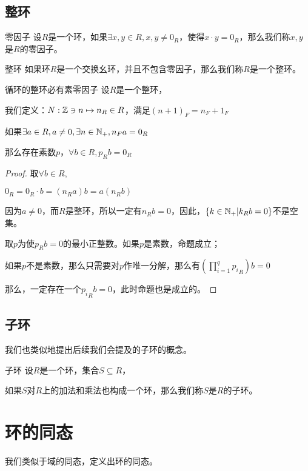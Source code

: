 \documentclass[12pt, a4paper, oneside, UTF8]{ctexbook}
\begin{document}
		\subsection{整环}
			\begin{defn}{零因子}{}
				设$R$是一个环，如果$\exists x,y \in R,x,y \neq 0_R$，使得$x \cdot y = 0_R$，那么我们称$x,y$是$R$的零因子。
			\end{defn}
			\begin{defn}{整环}{}
				如果环$R$是一个交换幺环，并且不包含零因子，那么我们称$R$是一个整环。
			\end{defn}
			\begin{them}{循环的整环必有素零因子}{}
				设$R$是一个整环，
				
				我们定义：$N : \mathbb{Z} \ni n \mapsto n_R \in R$，满足$(n+1)_F = n_F+1_F$

				如果$\exists a \in R,a \neq 0,\exists n \in \mathbb{N}_+,n_F a = 0_R$

				那么存在素数$p$，$\forall b \in R,p_R b=0_R$
			\end{them}
			\begin{proof}
				取$\forall b \in R$,

				$0_R=0_R\cdot b=(n_R a)b=a(n_R b)$

				因为$a \neq 0$，而$R$是整环，所以一定有$n_R b=0$，因此，$\{k\in \mathbb{N}_+|k_R b=0\}$不是空集。

				取$p$为使$p_R b=0$的最小正整数。如果$p$是素数，命题成立；

				如果$p$不是素数，那么只需要对$p$作唯一分解，那么有$\left(\prod\limits_{i=1}^{q} {p_i}_R\right)b=0$

				那么，一定存在一个${p_i}_R b=0$，此时命题也是成立的。
			\end{proof}
		\subsection{子环}
			我们也类似地提出后续我们会提及的子环的概念。
			\begin{defn}{子环}{}
				设$R$是一个环，集合$S \subseteq R$，
				
				如果$S$对$R$上的加法和乘法也构成一个环，那么我们称$S$是$R$的子环。
			\end{defn}
	\section{环的同态}
		我们类似于域的同态，定义出环的同态。
\end{document}
